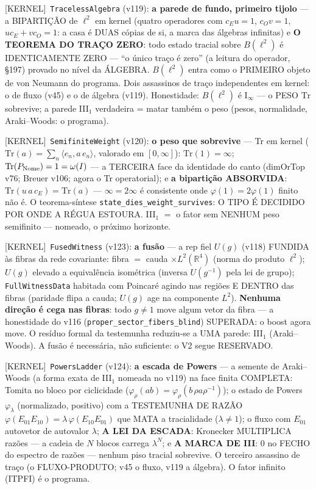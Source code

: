 \documentclass[11pt]{article}
\providecommand{\kernelmk}[1]{\textsf{[KERNEL]}~\texttt{#1}}\providecommand{\knownmk}[1]{\textsf{[KNOWN]}~{#1}}\providecommand{\statusmk}[1]{\textsf{[#1]}}
\theoremstyle{definition}\newtheorem{deriv}{Derivação}
\begin{document}
\kernelmk{TracelessAlgebra} (v119): \textbf{a parede de fundo, primeiro tijolo} --- a BIPARTIÇÃO de $\ell^2$ em kernel (quatro operadores com $c_E u=1$, $c_O v=1$, $u c_E+v c_O=1$: a casa é DUAS cópias de si, a marca das álgebras infinitas) e \textbf{O TEOREMA DO TRAÇO ZERO}: todo estado tracial sobre $B(\ell^2)$ é IDENTICAMENTE ZERO --- ``o único traço é zero'' (a leitura do operador, \S197) provado no nível da ÁLGEBRA. $B(\ell^2)$ entra como o PRIMEIRO objeto de von Neumann do programa. Dois assassinos de traço independentes em kernel: o de fluxo (v45) e o de álgebra (v119). Honestidade: $B(\ell^2)$ é I$_\infty$ --- o PESO $\mathrm{Tr}$ sobrevive; a parede III$_1$ verdadeira = matar também o peso (pesos, normalidade, Araki--Woods: o programa).

\kernelmk{SemifiniteWeight} (v120): \textbf{o peso que sobrevive} --- Tr em kernel ($\mathrm{Tr}(a)=\sum_n\langle e_n,a\,e_n\rangle$, valorado em $[0,\infty]$): $\mathrm{Tr}(1)=\infty$; \textbf{$\mathrm{Tr}(P_{\rm Nome})=1=\omega(I)$} --- a TERCEIRA face da identidade do canto (dimOrTop v76; Breuer v106; agora o Tr operatorial); e \textbf{a bipartição ABSORVIDA}: $\mathrm{Tr}(u\,a\,c_E)=\mathrm{Tr}(a)$ --- $\infty=2\infty$ é consistente onde $\varphi(1)=2\varphi(1)$ finito não é. O teorema-síntese \texttt{state\_dies\_weight\_survives}: O TIPO É DECIDIDO POR ONDE A RÉGUA ESTOURA. III$_1$ $=$ o fator sem NENHUM peso semifinito --- nomeado, o próximo horizonte.

\kernelmk{FusedWitness} (v123): \textbf{a fusão} --- a rep fiel $U(g)$ (v118) FUNDIDA às fibras da rede covariante: fibra $=$ cauda $\times L^2(\mathbb{R}^4)$ (norma do produto $\ell^2$); $U(g)$ elevado a equivalência isométrica (inversa $U(g^{-1})$ pela lei de grupo); \texttt{FullWitnessData} habitada com Poincaré agindo nas regiões E DENTRO das fibras (paridade flipa a cauda; $U(g)$ age na componente $L^2$). \textbf{Nenhuma direção é cega nas fibras}: todo $g\neq 1$ move algum vetor da fibra --- a honestidade do v116 (\texttt{proper\_sector\_fibers\_blind}) SUPERADA: o boost agora move. O resíduo formal da testemunha reduziu-se a UMA parede: III$_1$ (Araki--Woods). A fusão é necessária, não suficiente: o V2 segue RESERVADO.

\kernelmk{PowersLadder} (v124): \textbf{a escada de Powers} --- a semente de Araki--Woods (a forma exata de III$_1$ nomeada no v119) na face finita COMPLETA: Tomita no bloco por ciclicidade ($\varphi_\rho(ab)=\varphi_\rho(b\,\rho a\rho^{-1})$); o estado de Powers $\varphi_\lambda$ (normalizado, positivo) com a TESTEMUNHA DE RAZÃO $\varphi(E_{01}E_{10})=\lambda\,\varphi(E_{10}E_{01})$ que MATA a tracialidade ($\lambda\neq1$); o fluxo com $E_{01}$ autovetor de autovalor $\lambda$; \textbf{A LEI DA ESCADA}: Kronecker MULTIPLICA razões — a cadeia de $N$ blocos carrega $\lambda^N$; e \textbf{A MARCA DE III}: $0$ no FECHO do espectro de razões — nenhum piso tracial sobrevive. O terceiro assassino de traço (o FLUXO-PRODUTO; v45 o fluxo, v119 a álgebra). O fator infinito (ITPFI) é o programa.
\end{document}

